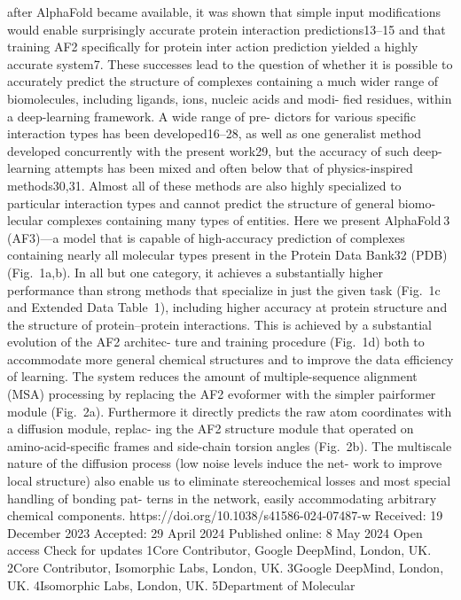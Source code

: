 after AlphaFold became available, it was shown that simple input
modifications would enable surprisingly accurate protein interaction
predictions13–15 and that training AF2 specifically for protein inter­
action prediction yielded a highly accurate system7.
These successes lead to the question of whether it is possible to
accurately predict the structure of complexes containing a much wider
range of biomolecules, including ligands, ions, nucleic acids and modi-
fied residues, within a deep-learning framework. A wide range of pre-
dictors for various specific interaction types has been developed16–28,
as well as one generalist method developed concurrently with the
present work29, but the accuracy of such deep-learning attempts has
been mixed and often below that of physics-inspired methods30,31.
Almost all of these methods are also highly specialized to particular
interaction types and cannot predict the structure of general biomo-
lecular complexes containing many types of entities.
Here we present AlphaFold 3 (AF3)—a model that is capable of
high-accuracy prediction of complexes containing nearly all molecular
types present in the Protein Data Bank32 (PDB) (Fig. 1a,b). In all but one
category, it achieves a substantially higher performance than strong
methods that specialize in just the given task (Fig. 1c and Extended
Data Table 1), including higher accuracy at protein structure and the
structure of protein–protein interactions.
This is achieved by a substantial evolution of the AF2 architec-
ture and training procedure (Fig. 1d) both to accommodate more
general chemical structures and to improve the data efficiency of
learning. The system reduces the amount of multiple-sequence
alignment (MSA) processing by replacing the AF2 evoformer with
the simpler pairformer module (Fig. 2a). Furthermore it directly
predicts the raw atom coordinates with a diffusion module, replac-
ing the AF2 structure module that operated on amino-acid-specific
frames and side-chain torsion angles (Fig. 2b). The multiscale
nature of the diffusion process (low noise levels induce the net-
work to improve local structure) also enable us to eliminate
stereochemical losses and most special handling of bonding pat-
terns in the network, easily accommodating arbitrary chemical
components.
https://doi.org/10.1038/s41586-024-07487-w
Received: 19 December 2023
Accepted: 29 April 2024
Published online: 8 May 2024
Open access
 Check for updates
1Core Contributor, Google DeepMind, London, UK. 2Core Contributor, Isomorphic Labs, London, UK. 3Google DeepMind, London, UK. 4Isomorphic Labs, London, UK. 5Department of Molecular
